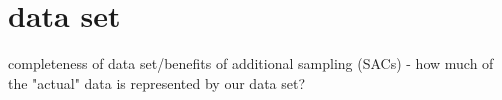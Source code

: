 \section{data set}

completeness of data set/benefits of additional sampling (SACs)
- how much of the "actual" data is represented by our data set?

